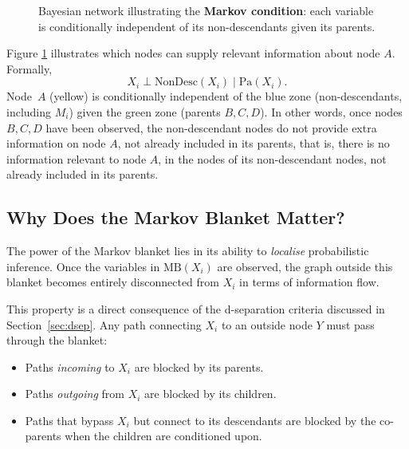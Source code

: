 \begin{figure}[H]
{%
}%

\caption{Bayesian network illustrating the \textbf{Markov condition}: each variable is
conditionally independent of its non-descendants given its parents. \label{fig:markov-condition}}

\end{figure}

Figure \ref{fig:markov-condition} illustrates which nodes can supply relevant information about node $A$.  Formally,
\[
  X_i \perp \mathrm{NonDesc}(X_i) \mid \mathrm{Pa}(X_i).
\]
Node~$A$ (yellow) is conditionally independent of the blue zone
(non-descendants, including $M_i$) given the green zone (parents $B, C, D$). In other words, once nodes $B, C, D$ have been observed, the non-descendant nodes do not provide extra information on node $A$, not already included in its parents, that is, there is no information relevant to node $A$, in the nodes of its non-descendant nodes, not already included in its parents.

\subsection{Why Does the Markov Blanket Matter?}

The power of the Markov blanket lies in its ability to \emph{localise} probabilistic inference. Once the variables in \(\mathrm{MB}(X_i)\) are observed, the graph outside this blanket becomes entirely disconnected from \(X_i\) in terms of information flow.

This property is a direct consequence of the d-separation criteria discussed in Section~\ref{sec:dsep}. Any path connecting \(X_i\) to an outside node \(Y\) must pass through the blanket:
\begin{itemize}
    \item Paths \emph{incoming} to \(X_i\) are blocked by its parents.
    \item Paths \emph{outgoing} from \(X_i\) are blocked by its children.
    \item Paths that bypass \(X_i\) but connect to its descendants are blocked by the co-parents when the children are conditioned upon.
\end{itemize}

